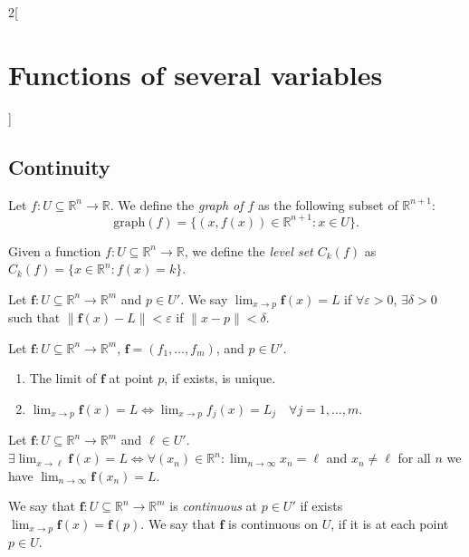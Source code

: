 \documentclass[class=article,10pt,crop=false]{standalone}
\begin{document}
\begin{multicols}{2}[\section{Functions of several variables}]
\subsection{Continuity}
\begin{definition}
Let $f:U\subseteq\mathbb{R}^n\rightarrow\mathbb{R}$. We define the \textit{graph of $f$} as the following subset of $\mathbb{R}^{n+1}$: $$\text{graph}(f)=\{(x,f(x))\in\mathbb{R}^{n+1}:x\in U\}.$$
\end{definition}
\begin{definition}
Given a function $f:U\subseteq\mathbb{R}^n\rightarrow\mathbb{R}$, we define the \textit{level set $C_k(f)$} as $C_k(f)=\{x\in\mathbb{R}^n:f(x)=k\}$.
\end{definition}
\begin{definition}
Let $\boldsymbol{f}:U\subseteq\mathbb{R}^n\rightarrow\mathbb{R}^m$ and $p\in U'$. We say $\displaystyle\lim_{x\to p}\boldsymbol{f}(x)=L$ if $\forall\varepsilon>0$, $\exists\delta>0$ such that $\|\mathbf{\boldsymbol{f}}(x)-L\|<\varepsilon$ if $\|x-p\|<\delta$.
\end{definition}
\begin{prop}
Let $\mathbf{\boldsymbol{f}}:U\subseteq\mathbb{R}^n\rightarrow\mathbb{R}^m$, $\mathbf{\boldsymbol{f}}=(f_1,\ldots,f_m)$, and $p\in U'$.
\begin{enumerate}
    \item The limit of $\mathbf{\boldsymbol{f}}$ at point $p$, if exists, is unique.
    \item $\displaystyle\lim_{x\to p}\mathbf{\boldsymbol{f}}(x)=L\iff\lim_{x\to p}f_j(x)=L_j\quad\forall j=1,\ldots,m$.
\end{enumerate}
\end{prop}
\begin{lemma}
Let $\mathbf{\boldsymbol{f}}:U\subseteq\mathbb{R}^n\rightarrow\mathbb{R}^m$ and $\ell\in U'$. $\displaystyle\exists\lim_{x\to \ell}\mathbf{\boldsymbol{f}}(x)=L\iff\forall(x_n)\in\mathbb{R}^n:\lim_{n\to\infty}x_n=\ell$ and $x_n\ne \ell$ for all $n$ we have $\displaystyle\lim_{n\to \infty}\mathbf{\boldsymbol{f}}(x_n)=L$.
\end{lemma}
\begin{definition}
We say that $\mathbf{\boldsymbol{f}}:U\subseteq\mathbb{R}^n\rightarrow\mathbb{R}^m$ is \textit{continuous} at $p\in U'$ if exists $\displaystyle\lim_{x\to p}\mathbf{\boldsymbol{f}}(x)=\mathbf{\boldsymbol{f}}(p)$. We say that $\mathbf{\boldsymbol{f}}$ is continuous on $U$, if it is at each point $p\in U$.
\end{definition}

\end{multicols}
\end{document}
